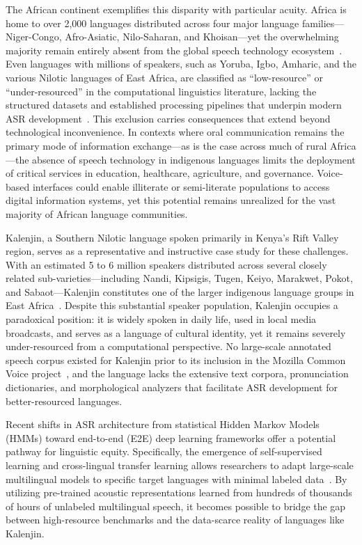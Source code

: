 \documentclass[journal]{IEEEtran}
\begin{document}
The African continent exemplifies this disparity with particular acuity. Africa is home to over 2,000 languages distributed across four major language families---Niger-Congo, Afro-Asiatic, Nilo-Saharan, and Khoisan---yet the overwhelming majority remain entirely absent from the global speech technology ecosystem~\cite{adelani2022masakhaner}. Even languages with millions of speakers, such as Yoruba, Igbo, Amharic, and the various Nilotic languages of East Africa, are classified as ``low-resource'' or ``under-resourced'' in the computational linguistics literature, lacking the structured datasets and established processing pipelines that underpin modern ASR development~\cite{magueresse2020low, besacier2014automatic}. This exclusion carries consequences that extend beyond technological inconvenience. In contexts where oral communication remains the primary mode of information exchange---as is the case across much of rural Africa---the absence of speech technology in indigenous languages limits the deployment of critical services in education, healthcare, agriculture, and governance. Voice-based interfaces could enable illiterate or semi-literate populations to access digital information systems, yet this potential remains unrealized for the vast majority of African language communities.

Kalenjin, a Southern Nilotic language spoken primarily in Kenya's Rift Valley region, serves as a representative and instructive case study for these challenges. With an estimated 5 to 6 million speakers distributed across several closely related sub-varieties---including Nandi, Kipsigis, Tugen, Keiyo, Marakwet, Pokot, and Sabaot---Kalenjin constitutes one of the larger indigenous language groups in East Africa~\cite{toweett1979study, ethnologue2023}. Despite this substantial speaker population, Kalenjin occupies a paradoxical position: it is widely spoken in daily life, used in local media broadcasts, and serves as a language of cultural identity, yet it remains severely under-resourced from a computational perspective. No large-scale annotated speech corpus existed for Kalenjin prior to its inclusion in the Mozilla Common Voice project~\cite{ardila2020common}, and the language lacks the extensive text corpora, pronunciation dictionaries, and morphological analyzers that facilitate ASR development for better-resourced languages.

Recent shifts in ASR architecture from statistical Hidden Markov Models (HMMs) toward end-to-end (E2E) deep learning frameworks offer a potential pathway for linguistic equity. Specifically, the emergence of self-supervised learning and cross-lingual transfer learning allows researchers to adapt large-scale multilingual models to specific target languages with minimal labeled data~\cite{babu2022xls, conneau2021unsupervised}. By utilizing pre-trained acoustic representations learned from hundreds of thousands of hours of unlabeled multilingual speech, it becomes possible to bridge the gap between high-resource benchmarks and the data-scarce reality of languages like Kalenjin.
\end{document}
